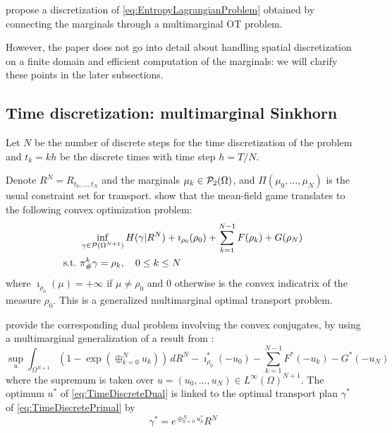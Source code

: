 \documentclass[../report.tex]{subfiles}
\begin{document}
\textcite{benamou2018entropy} propose a discretization of \eqref{eq:EntropyLagrangianProblem} obtained by connecting the marginals through a multimarginal OT problem.

However, the paper does not go into detail about handling spatial discretization on a finite domain and efficient computation of the marginals: we will clarify these points in the later subsections.


\subsection{Time discretization: multimarginal Sinkhorn}\label{sec:MMOT}

Let $N$ be the number of discrete steps for the time discretization of the problem and $t_k = kh$ be the discrete times with time step $h=T/N$.

Denote $R^N = R_{t_0,\ldots,t_N}$ and the marginals $\mu_k \in \mathcal{P}_2(\Omega)$, and $\Pi(\mu_0, \ldots, \mu_N)$ is the usual constraint set for transport. \textcite{benamou2018entropy} show that the mean-field game translates to the following convex optimization problem:
\begin{equation}\label{eq:TimeDiscretePrimal}
\begin{aligned}
&\inf_{\gamma \in \mathcal{P}(\Omega^{N+1})}
H(\gamma | R^N) + \imath_{\rho_0}(\rho_0) + \sum_{k=1}^{N-1} F(\rho_k) + G(\rho_N) \\
\mathrm{s.t.}\ &\pi^k_\#\gamma = \rho_k, \quad 0\leq k\leq N
\end{aligned}
\end{equation}
where $\imath_{\rho_0}(\mu) = +\infty$ if $\mu\neq \rho_0$ and $0$ otherwise is the convex indicatrix of the measure $\rho_0$. This is a generalized multimarginal optimal transport problem.

\textcite{benamou2018entropy} provide the corresponding dual problem involving the convex conjugates, by using a multimarginal generalization of a result from \textcite{chizat2016scaling}:
\begin{equation}\label{eq:TimeDiscreteDual}
\sup_u
\int_{\Omega^{N+1}} \left(1-\exp\left(\oplus_{k=0}^N u_k\right)\right) \,dR^N
-\imath_{\rho_0}^*(-u_0) - \sum_{k=1}^{N-1} F^*(-u_k) - G^*(-u_N)
\end{equation}
where the supremum is taken over $u = (u_0,\ldots,u_N) \in L^\infty(\Omega)^{N+1}$. The optimum $u^*$ of \eqref{eq:TimeDiscreteDual} is linked to the optimal transport plan $\gamma^*$ of \eqref{eq:TimeDiscretePrimal} by
\begin{equation}
	\gamma^* = e^{\oplus_{k=0}^N u^*_k} R^N
\end{equation}
\end{document}
